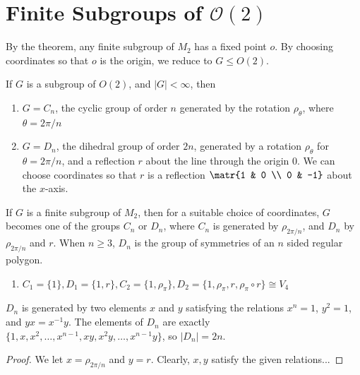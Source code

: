 \section{\texorpdfstring{Finite Subgroups of $\mathcal O(2)$}{Finite Subgroups of O(2)}}
By the theorem, any finite subgroup of $M_2$ has a fixed point $o$. By choosing coordinates so that $o$ is the origin, we reduce to $G \leq O(2)$.

\begin{thm}[][label=thm:finite-o2]
    If $G$ is a subgroup of $O(2)$, and $|G| < \infty$, then
    \begin{enumerate}
        \item[(i)] $G= C_n$, the cyclic group of order $n$ generated by the rotation $\rho _\theta$, where $\theta=2\pi /n$
        \item[(ii)] $G=D_n$, the dihedral group of order $2n$, generated by a rotation $\rho_ \theta$ for $\theta = 2\pi /n$, and a reflection $r$ about the line through the origin $0$. We can choose coordinates so that $r$ is a reflection $\matr{1 & 0 \\ 0 & -1}$ about the $x$-axis.
    \end{enumerate}
\end{thm}

\begin{cor}
    If $G$ is a finite subgroup of $M_2$, then for a suitable choice of coordinates, $G$ becomes one of the groups $C_n$ or $D_n$, where $C_n$ is generated by $\rho _{2\pi/n}$, and $D_n$ by $\rho_{2\pi / n}$ and $r$. When $n \geq 3$, $D_n$ is the group of symmetries of an $n$ sided regular polygon.
\end{cor}

\begin{ex}
    \begin{enumerate}
        \item $C_1 = \{1\}, D_1=\{1,r\},C_2=\{1, \rho _ \pi\}, D_2 = \{1, \rho_\pi, r, \rho _\pi \circ r\} \cong V_4$
    \end{enumerate}
\end{ex}

\begin{prop}
    $D_n$ is generated by two elements $x$ and $y$ satisfying the relations $x^n=1$, $y^2=1$, and $yx=x^{-1}y$. The elements of $D_n$ are exactly $\{1,x,x^2,\dots,x^{n-1},xy,x^2y,\dots,x^{n-1}y\}$, so $|D_n| = 2n$.
\end{prop}

\begin{proof}
    We let $x = \rho _{2 \pi /n}$ and $y = r$. Clearly, $x,y$ satisfy the given relations...
\end{proof}

